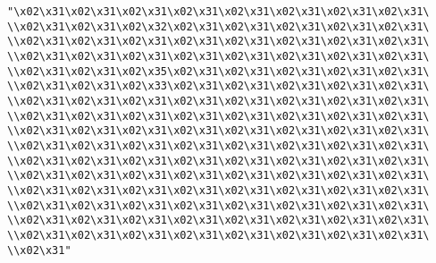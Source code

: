 \verb|"\x02\x31\x02\x31\x02\x31\x02\x31\x02\x31\x02\x31\x02\x31\x02\x31\|\newline
\verb|\\x02\x31\x02\x31\x02\x32\x02\x31\x02\x31\x02\x31\x02\x31\x02\x31\|\newline
\verb|\\x02\x31\x02\x31\x02\x31\x02\x31\x02\x31\x02\x31\x02\x31\x02\x31\|\newline
\verb|\\x02\x31\x02\x31\x02\x31\x02\x31\x02\x31\x02\x31\x02\x31\x02\x31\|\newline
\verb|\\x02\x31\x02\x31\x02\x35\x02\x31\x02\x31\x02\x31\x02\x31\x02\x31\|\newline
\verb|\\x02\x31\x02\x31\x02\x33\x02\x31\x02\x31\x02\x31\x02\x31\x02\x31\|\newline
\verb|\\x02\x31\x02\x31\x02\x31\x02\x31\x02\x31\x02\x31\x02\x31\x02\x31\|\newline
\verb|\\x02\x31\x02\x31\x02\x31\x02\x31\x02\x31\x02\x31\x02\x31\x02\x31\|\newline
\verb|\\x02\x31\x02\x31\x02\x31\x02\x31\x02\x31\x02\x31\x02\x31\x02\x31\|\newline
\verb|\\x02\x31\x02\x31\x02\x31\x02\x31\x02\x31\x02\x31\x02\x31\x02\x31\|\newline
\verb|\\x02\x31\x02\x31\x02\x31\x02\x31\x02\x31\x02\x31\x02\x31\x02\x31\|\newline
\verb|\\x02\x31\x02\x31\x02\x31\x02\x31\x02\x31\x02\x31\x02\x31\x02\x31\|\newline
\verb|\\x02\x31\x02\x31\x02\x31\x02\x31\x02\x31\x02\x31\x02\x31\x02\x31\|\newline
\verb|\\x02\x31\x02\x31\x02\x31\x02\x31\x02\x31\x02\x31\x02\x31\x02\x31\|\newline
\verb|\\x02\x31\x02\x31\x02\x31\x02\x31\x02\x31\x02\x31\x02\x31\x02\x31\|\newline
\verb|\\x02\x31\x02\x31\x02\x31\x02\x31\x02\x31\x02\x31\x02\x31\x02\x31\|\newline
\verb|\\x02\x31"|\newline
